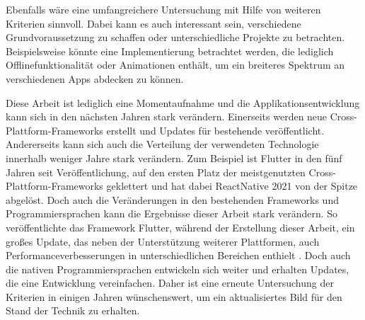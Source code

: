Ebenfalls wäre eine umfangreichere Untersuchung mit Hilfe von weiteren Kriterien sinnvoll. Dabei kann es auch interessant sein, verschiedene Grundvoraussetzung zu schaffen oder unterschiedliche Projekte zu betrachten. Beispielsweise könnte eine Implementierung betrachtet werden, die lediglich Offlinefunktionalität oder Animationen enthält, um ein breiteres Spektrum an verschiedenen Apps abdecken zu können.

Diese Arbeit ist lediglich eine Momentaufnahme und die Applikationsentwicklung kann sich in den nächsten Jahren stark verändern. Einerseits werden neue Cross-Plattform-Frameworks erstellt und Updates für bestehende veröffentlicht. Andererseits kann sich auch die Verteilung der verwendeten Technologie innerhalb weniger Jahre stark verändern. Zum Beispiel ist Flutter in den fünf Jahren seit Veröffentlichung, auf den ersten Platz der meistgenutzten Cross-Plattform-Frameworks geklettert und hat dabei ReactNative 2021 von der Spitze abgelöst. Doch auch die Veränderungen in den bestehenden Frameworks und Programmiersprachen kann die Ergebnisse dieser Arbeit stark verändern. So veröffentlichte das Framework Flutter, während der Erstellung dieser Arbeit, ein großes Update, das neben der Unterstützung weiterer Plattformen, auch Performanceverbesserungen in unterschiedlichen Bereichen enthielt \cite{flutter3}. Doch auch die nativen Programmiersprachen entwickeln sich weiter und erhalten Updates, die eine Entwicklung vereinfachen. Daher ist eine erneute Untersuchung der Kriterien in einigen Jahren wünschenswert, um ein aktualisiertes Bild für den Stand der Technik zu erhalten.





